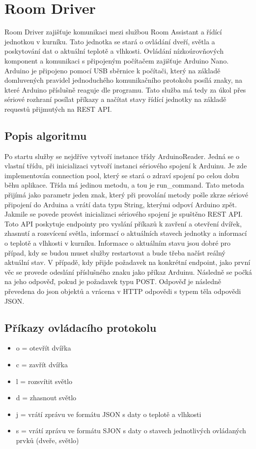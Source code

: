 \section{Room Driver}\label{sec:room-driver}
Room Driver zajišťuje komunikaci mezi službou Room Assistant a řídící jednotkou v kurníku.
Tato jednotka se stará o ovládání dveří, světla a poskytování dat o aktuální teplotě a vlhkosti.
Ovládání nízkoúrovňových komponent a komunikaci s připojeným počítačem zajišťuje Arduino Nano.
Arduino je připojeno pomocí USB sběrnice k počítači, který na základě domluvených pravidel jednoduchého komunikačního protokolu posílá znaky, na které Arduino příslušně reaguje dle programu.
Tato služba má tedy za úkol přes sériové rozhraní posílat příkazy a načítat stavy řídící jednotky na základě requestů přijmutých na REST API.

\subsection*{Popis algoritmu}
Po startu služby se nejdříve vytvoří instance třídy ArduinoReader.
Jedná se o vlastní třídu, při inicializaci vytvoří instanci sériového spojení k Arduinu.
Je zde implementován connection pool, který se stará o zdraví spojení po celou dobu běhu aplikace.
Třída má jedinou metodu, a tou je run\_command.
Tato metoda přijímá jako parametr jeden znak, který při provolání metody pošle zkrze sériové připojení do Arduina a vrátí data typu String, kterými odpoví Arduino zpět.
Jakmile se povede provést inicializaci sériového spojení je spuštěno REST API.
Toto API poskytuje endpointy pro vyslání příkazů k zavření a otevření dvířek, zhasnutí a rozsvícení světla, informací o aktuálních stavech jednotky a informací o teplotě a vlhkosti v kurníku.
Informace o aktuálním stavu jsou dobré pro případ, kdy se budou muset služby restartovat a bude třeba načíst reálný aktuální stav.
V případě, kdy přijde požadavek na konkrétní endpoint, jako první věc se provede odeslání příslušného znaku jako příkaz Arduinu.
Následně se počká na jeho odpověď, pokud je požadavek typu POST.
Odpověď je následně převedena do \gls{json} objektů a vrácena v HTTP odpovědi s typem těla odpovědi JSON.

\subsection*{Příkazy ovládacího protokolu}
\begin{itemize}
    \item o = otevřít dvířka
    \item c = zavřít dvířka
    \item l = rozsvítit světlo
    \item d = zhasnout světlo
    \item j = vrátí zprávu ve formátu JSON s daty o teplotě a vlhkosti
    \item s = vrátí zprávu ve formátu SJON s daty o stavech jednotlivých ovládaných prvků (dveře, světlo)
\end{itemize}


